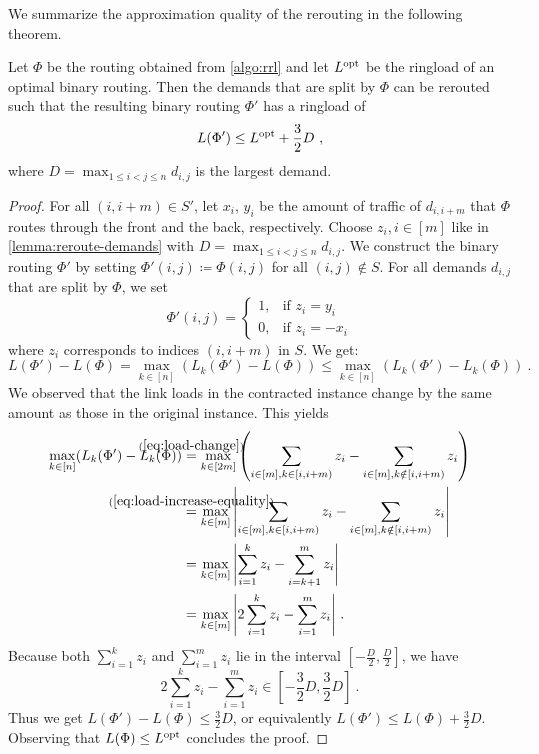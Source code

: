 We summarize the approximation quality of the rerouting in the following theorem.
\begin{theorem}
	\label{theo:ring-loading-algorithm}
	Let $\Phi$ be the routing obtained from \cref{algo:rrl} and let $L^{\mathrm{opt}}$ be the ringload of an optimal binary routing.
	Then the demands that are split by $\Phi$ can be rerouted such that the resulting binary routing $\Phi'$ has a ringload of
	\begin{equation}
		L(\Phi') \leq L^{\mathrm{opt}} + \frac{3}{2}D \ ,
	\end{equation}
	where $D = \max_{1 \leq i < j \leq n} d_{i, j}$ is the largest demand.
\end{theorem}
\begin{proof}
	For all $(i, i+m) \in S'$, let $x_i$, $y_i$ be the amount of traffic of $d_{i, i+m}$ that $\Phi$ routes through the front and the back, respectively.
	Choose $z_i, i \in [m]$ like in \cref{lemma:reroute-demands} with $D = \max_{1 \leq i < j \leq n} d_{i, j}$.
	We construct the binary routing $\Phi'$ by setting $\Phi'(i, j) \coloneqq \Phi(i, j)$ for all $(i, j) \notin S$.
	For all demands $d_{i, j}$ that are split by $\Phi$, we set
	\begin{equation}
		\Phi'(i, j) = \begin{cases}
			1, & \text{if } z_i = y_i \\
			0, & \text{if } z_i = -x_i
		\end{cases}
	\end{equation}
	where $z_i$ corresponds to indices $(i, i+m)$ in $S$.
	We get:
	\begin{equation}
		L(\Phi') - L(\Phi) 
		= \max_{k \in [n]} (L_k(\Phi') - L(\Phi)) 
		\leq \max_{k \in [n]} (L_k(\Phi') - L_k(\Phi)) \ .
	\end{equation}
	We observed that the link loads in the contracted instance change by the same amount as those in the original instance.
	This yields
	\begin{align}
		\max_{k \in [n]} (L_k(\Phi') - L_k(\Phi)) 
		&\stackrel{\mathclap{(\ref{eq:load-change})}}{=} \max_{k \in [2m]} \left(\sum_{\substack{i \in [m], k \in [i, i+m)}} z_i - \sum_{\substack{i \in [m], k \notin[i, i+m)}} z_i \right)\\
		&\stackrel{\mathclap{(\ref{eq:load-increase-equality})}}{=} \max_{k \in [m]} \abs{\sum_{\substack{i \in [m], k \in [i, i+m)}} z_i - \sum_{\substack{i \in [m], k \notin[i, i+m)}} z_i} \\
		& = \max_{k \in [m]} \abs{\sum_{i = 1}^k z_i - \sum_{i = k+1}^m z_i }\\
		& = \max_{k \in [m]} \abs{2\sum_{i = 1}^k z_i - \sum_{i = 1}^m z_i } \ . \label{eq:partial-reroutes}
	\end{align}
	Because both $\sum_{i = 1}^k z_i$ and $\sum_{i = 1}^m z_i$ lie in the interval $[-\frac{D}{2}, \frac{D}{2}]$, 
	we have 
	\begin{equation}
		2\sum_{i = 1}^k z_i - \sum_{i = 1}^m z_i \in [-\frac{3}{2}D, \frac{3}{2}D] \ .
	\end{equation}
	Thus we get $L(\Phi') - L(\Phi) \leq \frac{3}{2}D$, or equivalently $L(\Phi') \leq L(\Phi) + \frac{3}{2}D$.
	Observing that $L(\Phi) \leq L^{\mathrm{opt}}$ concludes the proof.
\end{proof}

